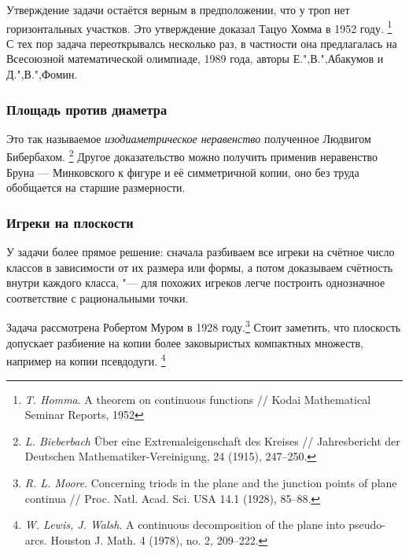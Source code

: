 \documentclass[twoside]{book}
\begin{document}
Утверждение задачи остаётся верным в предположении, что у троп нет горизонтальных участков.
Это утверждение доказал Тацуо Хомма в 1952 году.%
\footnote{\emph{T. Homma}. A theorem on continuous functions /\!/ Kodai Mathematical Seminar Reports, 1952}
С тех пор задача переоткрывалсь несколько раз, в частности она предлагалась на Всесоюзной математической олимпиаде, 1989 года, авторы Е.",В.",Абакумов и Д.",В.",Фомин.

\subsubsection{Площадь против диаметра}
Это так называемое \emph{изодиаметрическое неравенство} полученное Людвигом Бибербахом.
\footnote{\emph{L. Bieberbach} Über eine Extremaleigenschaft des Kreises /\!/ {Jahresbericht der Deutschen Mathematiker-Vereinigung}, 24 (1915), 247--250.}
Другое доказательство можно получить применив неравенство Бруна — Минковского к фигуре и её симметричной
копии, оно без труда обобщается на старшие размерности.

\subsubsection{Игреки на плоскости}
У задачи более прямое решение: сначала разбиваем все игреки на счётное число классов в зависимости от их размера или формы, 
а потом доказываем счётность внутри каждого класса, "--- для похожих игреков легче построить однозначное соответствие с рациональными точки.

Задача рассмотрена Робертом Муром в 1928 году.\footnote{\emph{R. L. Moore}. Concerning triods in the plane and the junction points of plane continua /\!/ {Proc. Natl. Acad. Sci. USA} 14.1 (1928), 85--88.}
Стоит заметить, что плоскость допускает разбиение на копии более заковыристых компактных множеств, например на копии псевдодуги.%
\footnote{\emph{W. Lewis, J. Walsh}. 
A continuous decomposition of the plane into pseudo-arcs.
Houston J. Math. 4 (1978), no. 2, 209--222.} 

{
\small

\printindex

}

{

\sloppy

\printbibliography[title={Дополнительная литература},heading=bibintoc]


\fussy

}

\newpage

{

\tableofcontents

}
\end{document}
